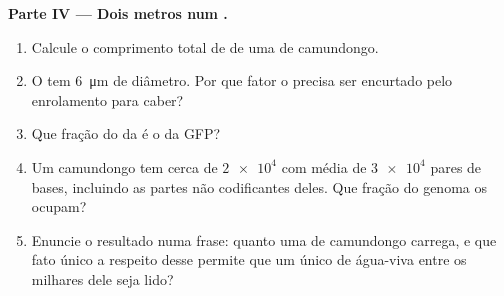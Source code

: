 \begin{problem}
\medskip
\noindent\textbf{Parte IV --- Dois metros num .}
\begin{enumerate}[resume]
  \item Calcule o comprimento total de  de uma  de camundongo.
  \item O  tem \qty{6}{\micro m} de diâmetro. Por que fator o 
        precisa ser encurtado pelo enrolamento para caber?
  \item Que fração do  da  é o  da GFP?
  \item Um camundongo tem cerca de $\num{2e4}$  com média de
        $\num{3e4}$ pares de bases, incluindo as partes não
        codificantes deles. Que fração do genoma os  ocupam?
  \item Enuncie o resultado numa frase: quanto  uma  de
        camundongo carrega, e que fato único a respeito desse 
        permite que um único  de água-viva entre os milhares dele
        seja lido?
\end{enumerate}
\end{problem}
